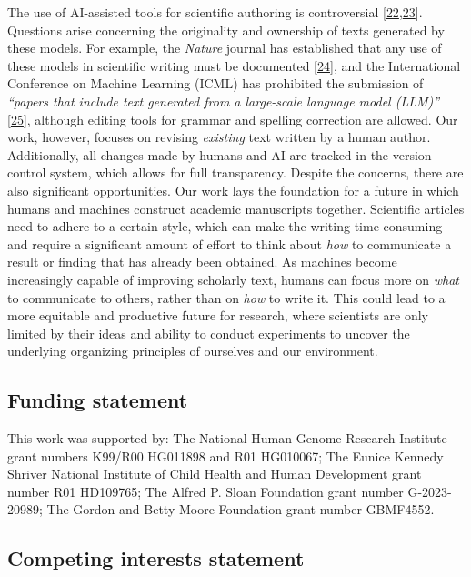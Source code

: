 \documentclass[
]{article}
\begin{document}
The use of AI-assisted tools for scientific authoring is controversial {[}\protect\hyperlink{ref-1EAonKBXJ}{22},\protect\hyperlink{ref-KJTJqmxc}{23}{]}.
Questions arise concerning the originality and ownership of texts generated by these models.
For example, the \emph{Nature} journal has established that any use of these models in scientific writing must be documented {[}\protect\hyperlink{ref-wQLVc4o7}{24}{]}, and the International Conference on Machine Learning (ICML) has prohibited the submission of \emph{``papers that include text generated from a large-scale language model (LLM)''} {[}\protect\hyperlink{ref-K58CKD6D}{25}{]}, although editing tools for grammar and spelling correction are allowed.
Our work, however, focuses on revising \emph{existing} text written by a human author.
Additionally, all changes made by humans and AI are tracked in the version control system, which allows for full transparency.
Despite the concerns, there are also significant opportunities.
Our work lays the foundation for a future in which humans and machines construct academic manuscripts together.
Scientific articles need to adhere to a certain style, which can make the writing time-consuming and require a significant amount of effort to think about \emph{how} to communicate a result or finding that has already been obtained.
As machines become increasingly capable of improving scholarly text, humans can focus more on \emph{what} to communicate to others, rather than on \emph{how} to write it.
This could lead to a more equitable and productive future for research, where scientists are only limited by their ideas and ability to conduct experiments to uncover the underlying organizing principles of ourselves and our environment.

\subsection{Funding statement}

This work was supported by:
The National Human Genome Research Institute grant numbers K99/R00 HG011898 and R01 HG010067;
The Eunice Kennedy Shriver National Institute of Child Health and Human Development grant number R01 HD109765;
The Alfred P. Sloan Foundation grant number G-2023-20989;
The Gordon and Betty Moore Foundation grant number GBMF4552.

\subsection{Competing interests statement}
\end{document}
